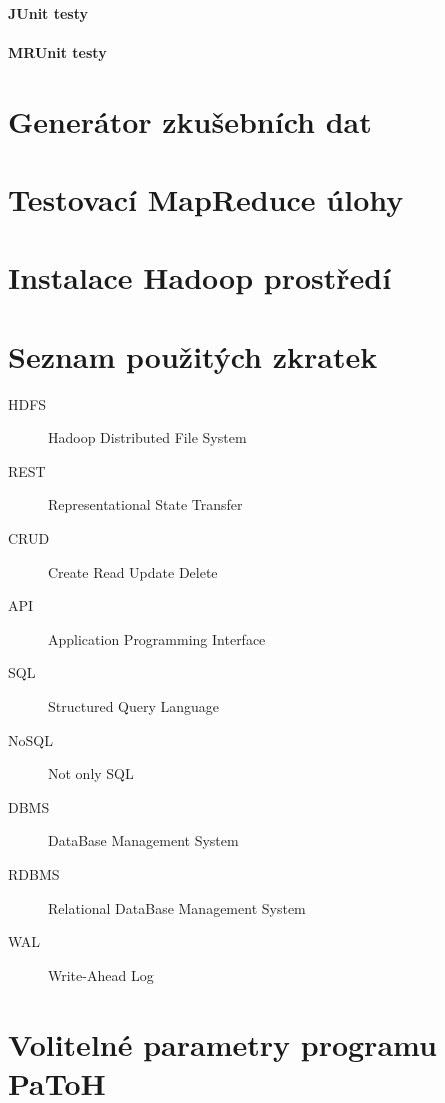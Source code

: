 \documentclass[thesis=M,czech]{FITthesis}[2012/06/26]
\begin{document}
\subsubsection{JUnit testy}
\subsubsection{MRUnit testy}



\begin{conclusion}
\end{conclusion}




\appendix

\chapter{Generátor zkušebních dat}
\chapter{Testovací MapReduce úlohy}
\chapter{Instalace Hadoop prostředí}

\chapter{Seznam použitých zkratek}
\begin{description}
	\item[HDFS] Hadoop Distributed File System
	\item[REST] Representational State Transfer
	\item[CRUD] Create Read Update Delete
	\item[API] Application Programming Interface
	\item[SQL] Structured Query Language
	\item[NoSQL] Not only SQL
	\item[DBMS] DataBase Management System
	\item[RDBMS] Relational DataBase Management System
	\item[WAL] Write-Ahead Log
	

\end{description}

\chapter{Volitelné parametry programu PaToH}\label{ch:patoh}
\end{document}
